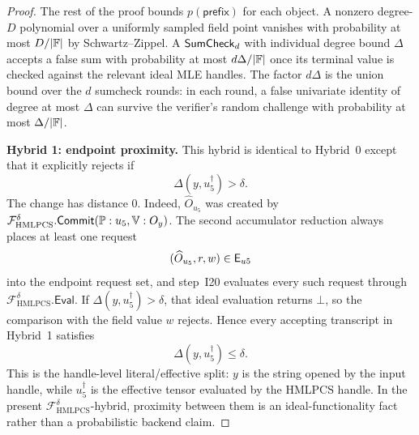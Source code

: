 \begin{proof}
The rest of the proof bounds \(p(\mathsf{prefix})\) for each object.  A nonzero
degree-\(D\) polynomial over a uniformly sampled field point vanishes with
probability at most \(D/|\mathbb{F}|\) by Schwartz--Zippel.  A
\(\mathsf{SumCheck}_d\) with individual degree bound \(\Delta\) accepts a false sum
with probability at most \(d\Delta/|\mathbb{F}|\) once its terminal value is checked
against the relevant ideal MLE handles.  The factor \(d\Delta\) is the union
bound over the \(d\) sumcheck rounds: in each round, a false univariate
identity of degree at most \(\Delta\) can survive the verifier's random
challenge with probability at most \(\Delta/|\mathbb{F}|\).

\smallskip\noindent\textbf{Hybrid 1: endpoint proximity.}
This hybrid is identical to Hybrid~0 except that it explicitly rejects if
\[
  \Delta(y,u_5^\dagger)>\delta.
\]
The change has distance \(0\).  Indeed,
\(\widehat O_{u_5}\) was created by
\(\mathcal F_{\mathrm{HMLPCS}}^\delta.\mathsf{Commit}
(\mathbb{P}:u_5,\mathbb{V}:O_y)\).  The second accumulator reduction always places
at least one request
\[
  (\widehat O_{u_5},r,w)\in\mathsf{E}_{u5}
\]
into the endpoint request set, and step~I20 evaluates every such request through
\(\mathcal F_{\mathrm{HMLPCS}}^\delta.\mathsf{Eval}\).  If
\(\Delta(y,u_5^\dagger)>\delta\), that ideal evaluation returns \(\bot\), so
the comparison with the field value \(w\) rejects.  Hence every accepting
transcript in Hybrid~1 satisfies
\[
  \Delta(y,u_5^\dagger)\le\delta.
\]
This is the handle-level literal/effective split: \(y\) is the string opened by
the input handle, while \(u_5^\dagger\) is the effective tensor evaluated by
the HMLPCS handle.  In the present
\(\mathcal F_{\mathrm{HMLPCS}}^\delta\)-hybrid, proximity between them is an
ideal-functionality fact rather than a probabilistic backend claim.


\end{proof}
